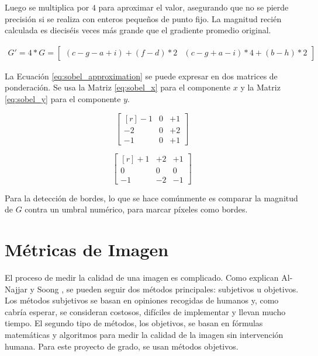 \documentclass[pregrado]{tesis-usb} %
\begin{document}
Luego se multiplica por $4$ para aproximar el valor, asegurando que no se pierde precisión si se realiza con enteros pequeños de punto fijo. La magnitud recién calculada es dieciséis veces más grande que el gradiente promedio original.

\begin{equation}\label{eq:sobel_approximation}
\begin{split}
G' = 4 * G =\begin{bmatrix*}(c-g-a+i)+(f-d)*2 & (c-g+a-i)*4+(b-h)*2\end{bmatrix*}
\end{split}
\end{equation}

La Ecuación \ref{eq:sobel_approximation} se puede expresar en dos matrices de ponderación. Se usa la Matriz \ref{eq:sobel_x} para el componente $x$ y la Matriz \ref{eq:sobel_y} para el componente $y$.

\begin{equation}
\begin{bmatrix*}[r]\label{eq:sobel_x}
-1 &  0 & +1 \\
-2 &  0 & +2 \\
-1 &  0 & +1
\end{bmatrix*}
\end{equation}

\begin{equation}
\begin{bmatrix*}[r]\label{eq:sobel_y}
+1 & +2 & +1 \\
 0 &  0 &  0 \\
-1 & -2 & -1
\end{bmatrix*}
\end{equation}

Para la detección de bordes, lo que se hace comúnmente es comparar la magnitud de $G$ contra un umbral numérico, para marcar píxeles como bordes.

\section{Métricas de Imagen}
El proceso de medir la calidad de una imagen es complicado. Como explican Al-Najjar y Soong \cite{Yusra2012}, se pueden seguir dos métodos principales: subjetivos u objetivos. Los métodos subjetivos se basan en opiniones recogidas de humanos y, como cabría esperar, se consideran costosos, difíciles de implementar y llevan mucho tiempo. El segundo tipo de métodos, los objetivos, se basan en fórmulas matemáticas y algoritmos para medir la calidad de la imagen sin intervención humana. Para este proyecto de grado, se usan métodos objetivos.
\end{document}

